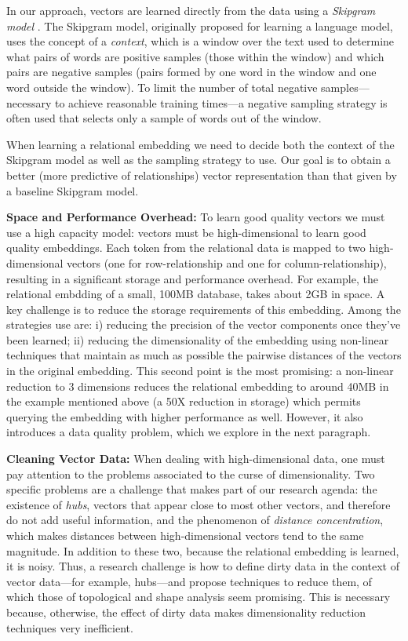 In our approach, vectors are learned directly from the data using a {\it
Skipgram model} \cite{skipgram}. The Skipgram model, originally proposed for
learning a language model, uses the concept of a \emph{context}, which is a
window over the text used to determine what pairs of words are positive samples
(those within the window) and which pairs are negative samples (pairs formed by
one word in the window and one word outside the window). To limit the number of
total negative samples---necessary to achieve reasonable training times---a
negative sampling strategy is often used that selects only a sample of words out of
the window.

When learning a relational embedding we need to decide both the context of the
Skipgram model as well as the sampling strategy to use. Our goal is to obtain a
better (more predictive of relationships) vector representation than that given
by a baseline Skipgram model. 

\noindent\textbf{Space and Performance Overhead: }To learn good quality vectors
we must use a high capacity model: vectors must be high-dimensional to learn
good quality embeddings.
Each token from the relational data
is mapped to two high-dimensional vectors (one for row-relationship and one for
column-relationship), resulting in a significant storage and performance
overhead. For example, the relational embdding of a small, 100MB database, takes
about 2GB in space. A key challenge is to reduce the storage requirements of
this embedding. Among the strategies use are: i) reducing the precision of the
vector components once they've been learned; ii) reducing the dimensionality of
the embedding using non-linear techniques \cite{tsne} that maintain as much as
possible the pairwise distances of the vectors in the original embedding. This
second point is the most promising: a non-linear reduction to 3 dimensions
reduces the relational embedding to around 40MB in the example mentioned above
(a 50X reduction in storage) which permits querying the embedding with higher
performance as well. However, it also introduces a data quality problem, which
we explore in the next paragraph.

\noindent\textbf{Cleaning Vector Data: }When dealing with high-dimensional data,
one must pay attention to the problems associated to the curse of
dimensionality. Two specific problems are a challenge that makes part of our
research agenda: the existence of \emph{hubs}, vectors that appear close to most
other vectors, and therefore do not add useful information, and the phenomenon
of \emph{distance concentration}, which makes distances between high-dimensional
vectors tend to the same magnitude. In addition to these two, because the
relational embedding is learned, it is noisy. Thus, a research challenge is how
to define dirty data in the context of vector data---for example, hubs---and
propose techniques to reduce them, of which those of topological and shape
analysis seem promising.  This is necessary because, otherwise, the effect of
dirty data makes dimensionality reduction techniques very inefficient.

